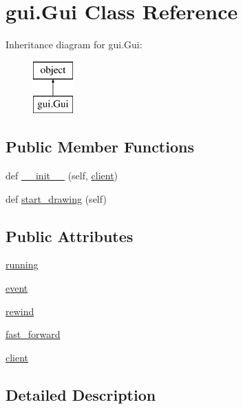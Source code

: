 \hypertarget{classgui_1_1_gui}{}\section{gui.\+Gui Class Reference}
\label{classgui_1_1_gui}
Inheritance diagram for gui.\+Gui\+:\begin{figure}[H]
\begin{center}
\leavevmode
\includegraphics[height=2.000000cm]{classgui_1_1_gui}
\end{center}
\end{figure}
\subsection*{Public Member Functions}
\begin{DoxyCompactItemize}
\item 
def \mbox{\hyperlink{classgui_1_1_gui_a78f4c12804c4f7043db8018eb343e342}{\+\_\+\+\_\+init\+\_\+\+\_\+}} (self, \mbox{\hyperlink{classgui_1_1_gui_af3570ee6e42bbdfb0463e7376389bbb2}{client}})
\item 
def \mbox{\hyperlink{classgui_1_1_gui_a629cf0014276095158a43b1bc18ef201}{start\+\_\+drawing}} (self)
\end{DoxyCompactItemize}
\subsection*{Public Attributes}
\begin{DoxyCompactItemize}
\item 
\mbox{\hyperlink{classgui_1_1_gui_a758ab9c1a5bf959018bc51324e74471b}{running}}
\item 
\mbox{\hyperlink{classgui_1_1_gui_a89e54e88320f796bada4f5eda88d422d}{event}}
\item 
\mbox{\hyperlink{classgui_1_1_gui_a67e330dafa5f5a20b707ceeca1d22d1b}{rewind}}
\item 
\mbox{\hyperlink{classgui_1_1_gui_a6be21c3e5b8c9d9c4296b22c88dfc5c5}{fast\+\_\+forward}}
\item 
\mbox{\hyperlink{classgui_1_1_gui_af3570ee6e42bbdfb0463e7376389bbb2}{client}}
\end{DoxyCompactItemize}


\subsection{Detailed Description}


